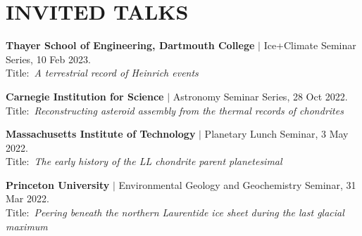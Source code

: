 \section*{INVITED TALKS}

\begin{etaremune} [itemsep=4pt, leftmargin=3ex]
  \item \textbf{Thayer School of Engineering, Dartmouth College} $|$ Ice+Climate Seminar Series, 10 Feb 2023. \\
  Title:~\textit{A terrestrial record of Heinrich events}
   \item \textbf{Carnegie Institution for Science} $|$
   Astronomy Seminar Series, 28 Oct 2022. \\
  Title:~\textit{Reconstructing asteroid assembly from the thermal records of chondrites}

   \item \textbf{Massachusetts Institute of Technology} $|$
   Planetary Lunch Seminar, 3 May 2022. \\
  Title:~\textit{The early history of the LL chondrite parent planetesimal}

  \item \textbf{Princeton University} $|$ 
  Environmental Geology and Geochemistry Seminar, 31 Mar 2022. \\
  Title:~\textit{Peering beneath the northern Laurentide ice sheet during the last glacial maximum}
  
\end{etaremune}